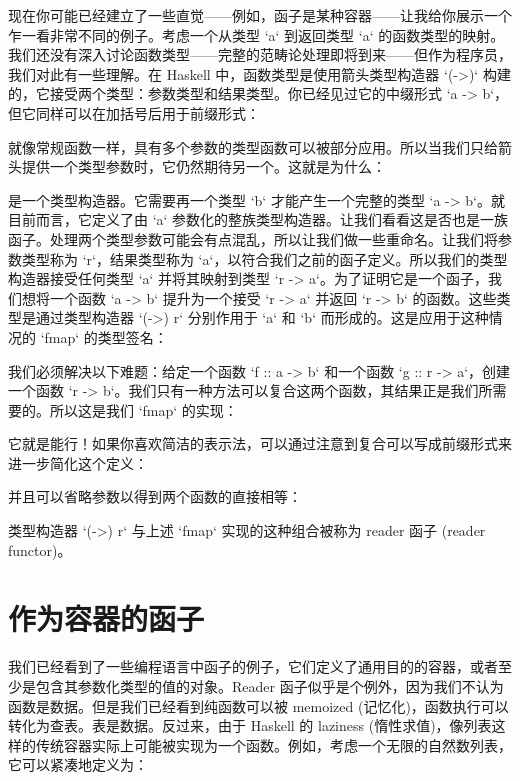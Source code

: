 现在你可能已经建立了一些直觉——例如，函子是某种容器——让我给你展示一个乍一看非常不同的例子。考虑一个从类型 `a` 到返回类型 `a` 的函数类型的映射。我们还没有深入讨论函数类型——完整的范畴论处理即将到来——但作为程序员，我们对此有一些理解。在 Haskell 中，函数类型是使用箭头类型构造器 `(->)` 构建的，它接受两个类型：参数类型和结果类型。你已经见过它的中缀形式 `a -> b`，但它同样可以在加括号后用于前缀形式：

就像常规函数一样，具有多个参数的类型函数可以被部分应用。所以当我们只给箭头提供一个类型参数时，它仍然期待另一个。这就是为什么：

是一个类型构造器。它需要再一个类型 `b` 才能产生一个完整的类型 `a -> b`。就目前而言，它定义了由 `a` 参数化的整族类型构造器。让我们看看这是否也是一族函子。处理两个类型参数可能会有点混乱，所以让我们做一些重命名。让我们将参数类型称为 `r`，结果类型称为 `a`，以符合我们之前的函子定义。所以我们的类型构造器接受任何类型 `a` 并将其映射到类型 `r -> a`。为了证明它是一个函子，我们想将一个函数 `a -> b` 提升为一个接受 `r -> a` 并返回 `r -> b` 的函数。这些类型是通过类型构造器 `(->) r` 分别作用于 `a` 和 `b` 而形成的。这是应用于这种情况的 `fmap` 的类型签名：

我们必须解决以下难题：给定一个函数 `f :: a -> b` 和一个函数 `g :: r -> a`，创建一个函数 `r -> b`。我们只有一种方法可以复合这两个函数，其结果正是我们所需要的。所以这是我们 `fmap` 的实现：

它就是能行！如果你喜欢简洁的表示法，可以通过注意到复合可以写成前缀形式来进一步简化这个定义：

并且可以省略参数以得到两个函数的直接相等：

类型构造器 `(->) r` 与上述 `fmap` 实现的这种组合被称为 reader 函子 (reader functor)。

\section{作为容器的函子}

我们已经看到了一些编程语言中函子的例子，它们定义了通用目的的容器，或者至少是包含其参数化类型的值的对象。Reader 函子似乎是个例外，因为我们不认为函数是数据。但是我们已经看到纯函数可以被 memoized (记忆化)，函数执行可以转化为查表。表是数据。反过来，由于 Haskell 的 laziness (惰性求值)，像列表这样的传统容器实际上可能被实现为一个函数。例如，考虑一个无限的自然数列表，它可以紧凑地定义为：

